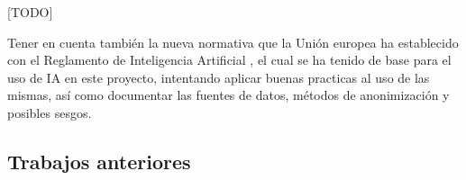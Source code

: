 [TODO]

Tener en cuenta también la nueva normativa que la Unión europea ha establecido con el Reglamento de Inteligencia Artificial \citep{webRIA2024Europa}, el cual se ha tenido de base para el uso de IA en este proyecto, intentando aplicar buenas practicas al uso de las mismas, así como documentar las fuentes de datos, métodos de anonimización y posibles sesgos.
	
	\subsection{Trabajos anteriores}


